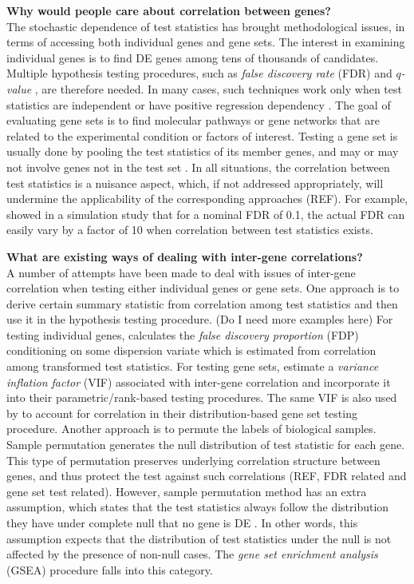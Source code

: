 \documentclass[12pt, a4paper]{article}
\begin{document}
	\textbf{Why would people care about correlation between genes?}\\
	 The stochastic dependence of test statistics has brought methodological issues, in terms of accessing both individual genes and gene sets. 
	 The interest in examining individual genes is to find DE genes among tens of thousands of candidates. Multiple hypothesis testing 
	 procedures, such as \textit{false discovery rate} (FDR) \citep{benjamini1995controlling} and \textit{$q$-value} \citep{storey2003positive}, 
	 are therefore needed. In many cases, such techniques work only when test statistics are independent \citep{benjamini1995controlling} or 
	 have positive regression dependency \citep{benjamini2001control}. The goal of evaluating gene sets is to find molecular pathways or gene 
	 networks that are related to the experimental condition or factors of interest. Testing a gene set is usually done by pooling the test 
	 statistics of its member genes, and may or may not involve genes not in the test set \citep{goeman2007analyzing}. In all situations, the 
	 correlation between test statistics is a nuisance aspect, which, if not addressed appropriately, will undermine the applicability of the 
	 corresponding approaches (REF). For
	 example, \citet{efron2007correlation} showed in a simulation study that for a nominal FDR of 0.1, the
	 actual FDR can easily vary by a factor of 10 when correlation between test statistics exists. 
	 
	 \textbf{What are existing ways of dealing with inter-gene correlations?}\\
	 A number of attempts have been made to deal with issues of inter-gene correlation when testing either individual genes or gene sets. One 
	 approach is to derive certain summary statistic from correlation among test statistics and then use it in the hypothesis testing procedure. 
	 (Do I need more examples here) For testing individual genes, \citet{efron2007correlation} calculates the \textit{false discovery 
	 proportion} (FDP) conditioning on some dispersion variate which is estimated from correlation among transformed test statistics.  For 
	 testing gene sets, \citet{wu2012camera} estimate a \textit{variance inflation factor} (VIF) associated with inter-gene correlation and 
	 incorporate it into their parametric/rank-based testing procedures. The same VIF is also used by \citet{yaari2013quantitative} to account 
	 for correlation in their distribution-based gene set testing procedure. Another approach is to permute the labels of biological samples. 
	 Sample permutation generates the null distribution of test statistic for each gene.
	 This type of permutation preserves underlying correlation structure between genes, and thus protect the test against such correlations 
	 (REF, FDR related and gene set test related). However, sample permutation method has an extra assumption, which states that the test 
	 statistics always follow the distribution they have under complete null  that no gene is DE \cite{efron2012large1}. In other words, this 
	 assumption expects that the distribution of test statistics under the null is not affected by the presence of non-null cases. The 
	 \textit{gene set enrichment analysis} (GSEA) procedure \citep{subramanian2005gene} falls into this category.
	 
\end{document}
